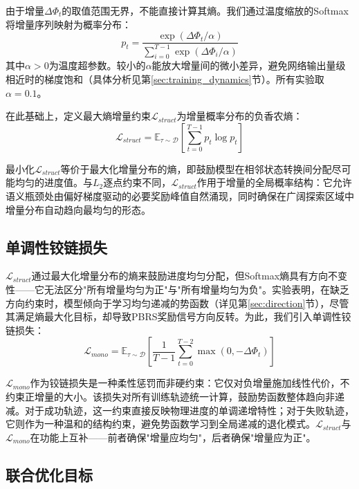 由于增量$\Delta\Phi_t$的取值范围无界，不能直接计算其熵。我们通过温度缩放的Softmax将增量序列映射为概率分布：
\begin{equation}
\label{eq:softmax}
    p_t = \frac{\exp(\Delta\Phi_t / \alpha)}{\sum_{i=0}^{T-1} \exp(\Delta\Phi_i / \alpha)}
\end{equation}
其中$\alpha > 0$为温度超参数。较小的$\alpha$能放大增量间的微小差异，避免网络输出量级相近时的梯度饱和（具体分析见第\ref{sec:training_dynamics}节）。所有实验取$\alpha = 0.1$。

在此基础上，定义最大熵增量约束$\mathcal{L}_{struct}$为增量概率分布的负香农熵：
\begin{equation}
\label{eq:lstruct}
    \mathcal{L}_{struct} = \mathbb{E}_{\tau \sim \mathcal{D}} \left[ \sum_{t=0}^{T-1} p_t \log p_t \right]
\end{equation}

最小化$\mathcal{L}_{struct}$等价于最大化增量分布的熵，即鼓励模型在相邻状态转换间分配尽可能均匀的进度值。与$L_2$逐点约束不同，$\mathcal{L}_{struct}$作用于增量的全局概率结构：它允许语义瓶颈处由偏好梯度驱动的必要奖励峰值自然涌现，同时确保在广阔探索区域中增量分布自动趋向最均匀的形态。

\subsection{单调性铰链损失}

$\mathcal{L}_{struct}$通过最大化增量分布的熵来鼓励进度均匀分配，但Softmax熵具有方向不变性——它无法区分"所有增量均匀为正"与"所有增量均匀为负"。实验表明，在缺乏方向约束时，模型倾向于学习均匀递减的势函数（详见第\ref{sec:direction}节），尽管其满足熵最大化目标，却导致PBRS奖励信号方向反转。为此，我们引入单调性铰链损失：
\begin{equation}
\label{eq:lmono}
    \mathcal{L}_{mono} = \mathbb{E}_{\tau \sim \mathcal{D}} \left[ \frac{1}{T-1}\sum_{t=0}^{T-2} \max(0, -\Delta\Phi_t) \right]
\end{equation}

$\mathcal{L}_{mono}$作为铰链损失是一种柔性惩罚而非硬约束：它仅对负增量施加线性代价，不约束正增量的大小。该损失对所有训练轨迹统一计算，鼓励势函数整体趋向非递减。对于成功轨迹，这一约束直接反映物理进度的单调递增特性；对于失败轨迹，它则作为一种温和的结构约束，避免势函数学习到全局递减的退化模式。$\mathcal{L}_{struct}$与$\mathcal{L}_{mono}$在功能上互补——前者确保"增量应均匀"，后者确保"增量应为正"。

\subsection{联合优化目标}
\label{sec:joint_objective}

